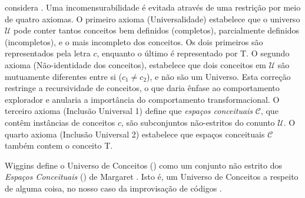 \begin{citacao}
\end{citacao}

 considera  . Uma incomensurabilidade é evitada através de uma restrição por meio de quatro axiomas. O primeiro axioma (Universalidade) estabelece que o universo $\mathcal{U}$ pode conter tantos conceitos bem definidos (completos), parcialmente definidos (incompletos), e  o mais incompleto dos conceitos. Os dois primeiros são representados pela letra $c$, enquanto o último é representado por \small{T}. O segundo axioma (Não-identidade dos conceitos), estabelece que dois conceitos em  $\mathcal{U}$ são mutuamente diferentes entre si ($c_1 \neq c_2$), e não são um Universo. Esta correção restringe a recursividade de conceitos, o que daria ênfase ao comportamento explorador e anularia a importância do comportamento transformacional. O terceiro axioma (Inclusão Universal 1) define que \emph{espaços conceituais} $\mathcal{C}$, que contêm instâncias de conceitos $c$, são subconjuntos não-estritos do conunto $\mathcal{U}$. O quarto axioma (Inclusão Universal 2) estabelece que espaços conceituais $\mathcal{C}$ também contem o conceito \small{T}.






 Wiggins define o Universo de Conceitos () como um conjunto não estrito dos \emph{Espaços Conceituais} () de Margaret . Isto é, um Universo de Conceitos a respeito de alguma coisa, no nosso caso da improvisação de códigos . 

